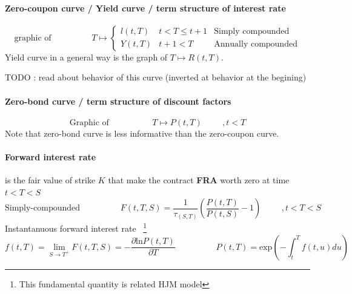 \documentclass[a4paper,10pt]{article}
\newcommand{\RtT}{R(t,T)}
\newcommand{\PtT}{P(t,T)}
\newcommand{\PtS}{P(t,S)}
\newcommand{\LtT}{l(t,T)}
\newcommand{\YtT}{Y(t,T)}
\newcommand{\ftT}{f(t,T)}
\newcommand{\inttT}{\int_t^T}
\newcommand{\FuncExp}{\text{exp}}
\newcommand{\FuncLn}{\text{ln}}
\newcommand{\todo}[1]{\begin{center}\color{red} TODO : #1\end{center}}
\begin{document}
\paragraph{Zero-coupon curve / Yield curve / term structure of interest rate}
\[
\text{graphic of}
\hspace{2cm}
T \longmapsto
\left\{
\begin{array}{lll}
\LtT  &  t < T \leq t+1 & \text{Simply compounded} \\
\YtT  &  t+1 < T        & \text{Annually compounded} 
\end{array}
\right.
\]
Yield curve in a general way is the graph of $T \longmapsto \RtT$.
\todo{read about behavior of this curve (inverted at behavior at the begining)}
\paragraph{Zero-bond curve / term structure of discount factors}
\[
\text{Graphic of }
\hspace{2cm}
T \longmapsto \PtT
\hspace{1cm}
,t<T
\]
Note that zero-bond curve is less informative than the zero-coupon curve.
\paragraph{Forward interest rate} is the fair value of strike $K$ that make the contract \textbf{FRA} worth zero at time $t<T<S$  
\[
\text{Simply-compounded}
\hspace{2cm}
F(t,T,S) = \frac{1}{ \tau_{(S,T)} }\left( \frac{\PtT}{\PtS} - 1 \right)
\hspace{1cm}
,t<T<S
\]
Instantanuous forward interest rate ~\footnote{This fundamental quantity is related HJM model}
\[
\ftT = \lim_{S\rightarrow T^+} F(t,T,S) = -\frac{\partial \FuncLn\PtT}{\partial T}
\hspace{2cm}
\PtT = \FuncExp\left( -\inttT f(t,u)du \right)
\]
\end{document}
